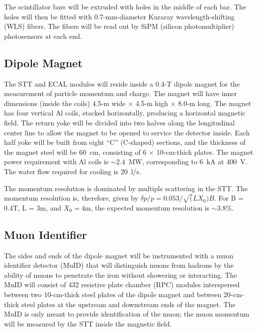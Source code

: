 The scintillator bars will be extruded with 
holes in the middle of each bar. The
holes will then be fitted with 0.7-mm-diameter Kuraray wavelength-shifting (WLS) fibers.
The fibers will be read out by SiPM (silicon photomultiplier) photosensors at each end.

\subsection{Dipole Magnet}
\label{cdrsec:detectors-nd-ref-fgt-magnet}

The STT and ECAL modules will reside inside a 0.4-T dipole 
magnet for the measurement of particle momentum and charge. 
The magnet will have inner dimensions (inside the coils) 
4.5-m wide $\times$ 4.5-m high $\times$ 8.0-m long. The 
magnet has four vertical Al coils, stacked horizontally, producing a horizontal magnetic 
field. The return yoke will be divided into two halves along the 
longitudinal center line to allow the magnet to be opened to service the
detector inside. %
Each half yoke will be built
from eight ``C'' (C-shaped) sections, and the thickness of the 
magnet steel will be 60~cm, consisting of 6
$\times$ 10-cm-thick plates. The magnet power requirement with Al coils is $\sim 2.4$~MW,
corresponding to 6~kA at 400~V. The water flow required for cooling is 20~l/s.

The momentum resolution is dominated by multiple scattering in the STT. The momentum resolution is, therefore, given by 
$\delta p/p = 0.053/\sqrt(LX_0)B$. For B = 0.4T, L = 3m, and $X_0 = 4$m, the
expected momentum resolution is $\sim 3.8\%$. 

\subsection{Muon Identifier}
\label{cdrsec:detectors-nd-ref-fgt-muonid}

The sides and ends of the dipole magnet will be instrumented
with a muon identifier
detector (MuID) that will distinguish muons from hadrons by the ability 
of muons to penetrate the iron without showering or interacting.
The MuID will consist of 432 resistive plate chamber (RPC) modules
interspersed between two 10-cm-thick steel plates of the 
dipole magnet and between 20-cm-thick steel plates at the upstream and
downstream ends of the magnet. 
The MuID is only meant to provide %
identification of the 
muon; the muon momentum %
will be measured by the STT inside the 
magnetic field.


